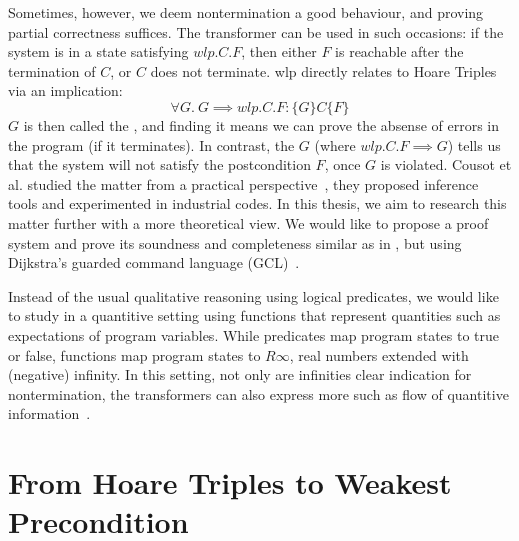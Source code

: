 Sometimes, however, we deem nontermination a good behaviour, and proving partial correctness suffices. 
The  transformer \cite{Dijkstra1990} can be used in such occasions: 
if the system is in a state satisfying $wlp.C.F$, then either $F$ is reachable after the termination of $C$, or $C$ does not terminate.
wlp directly relates to Hoare Triples via an implication: 
\[\forall G.\ G\implies wlp.C.F: \{G\} C \{F\}\]
$G$ is then called the , and finding it means we can prove the absense of errors in the program (if it terminates). 
In contrast, the  $G$ (where $ wlp.C.F\implies G$) tells us that the system will not satisfy the postcondition $F$, once $G$ is violated. 
Cousot et al. studied the matter from a practical perspective~\cite{Cousot2013}, they proposed inference tools and experimented in industrial codes.
In this thesis, we aim to research this matter further with a more theoretical view. 
We would like to propose a proof system and prove its soundness and completeness similar as in \cite{Vries2011}, but using Dijkstra's guarded command language (GCL)~\cite{Dijkstra1975}. 

Instead of the usual qualitative reasoning using logical predicates, we would like to study in a quantitive setting using functions that represent quantities such as expectations of program variables. 
While predicates map program states to true or false, functions map program states to $R\infty$, real numbers extended with (negative) infinity. 
In this setting, not only are infinities clear indication for nontermination, the transformers can also express more such as flow of quantitive information~\cite{Zhang2022}.

\section{From Hoare Triples to Weakest Precondition}



